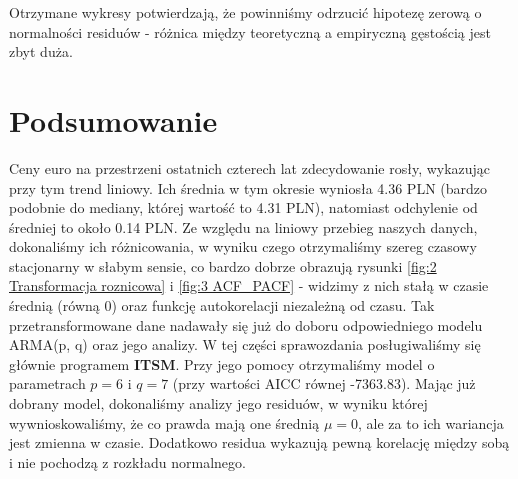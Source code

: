 \documentclass[fleqn]{article}
\theoremstyle{plain}
\begin{document}
    Otrzymane wykresy potwierdzają, że powinniśmy odrzucić hipotezę zerową o normalności residuów - 
    różnica między teoretyczną a empiryczną gęstością jest zbyt duża.

    \section*{Podsumowanie}

    Ceny euro na przestrzeni ostatnich czterech lat zdecydowanie rosły, wykazując przy tym trend liniowy. Ich średnia w tym okresie 
    wyniosła 4.36 PLN (bardzo podobnie do mediany, której wartość to 4.31 PLN), natomiast odchylenie 
    od średniej to około 0.14 PLN. Ze względu na liniowy przebieg naszych danych, dokonaliśmy ich różnicowania, w wyniku czego 
    otrzymaliśmy szereg czasowy stacjonarny w słabym sensie, co bardzo dobrze obrazują rysunki \ref{fig:2 Transformacja roznicowa} 
    i \ref{fig:3 ACF_PACF} - widzimy z nich stałą w czasie średnią (równą 0) oraz funkcję autokorelacji niezależną od czasu.
    Tak przetransformowane dane nadawały się już do doboru odpowiedniego modelu ARMA(p, q) oraz jego analizy.
    W tej części sprawozdania posługiwaliśmy się głównie programem \textbf{ITSM}. Przy jego pomocy otrzymaliśmy model o parametrach 
    $p=6$ i $q=7$ (przy wartości AICC równej -7363.83). Mając już dobrany model, dokonaliśmy
    analizy jego residuów, w wyniku której wywnioskowaliśmy, że co prawda mają one średnią $\mu=0$, 
    ale za to ich wariancja jest zmienna w czasie. Dodatkowo residua wykazują pewną korelację między sobą 
    i nie pochodzą z rozkładu normalnego. 
\end{document}
